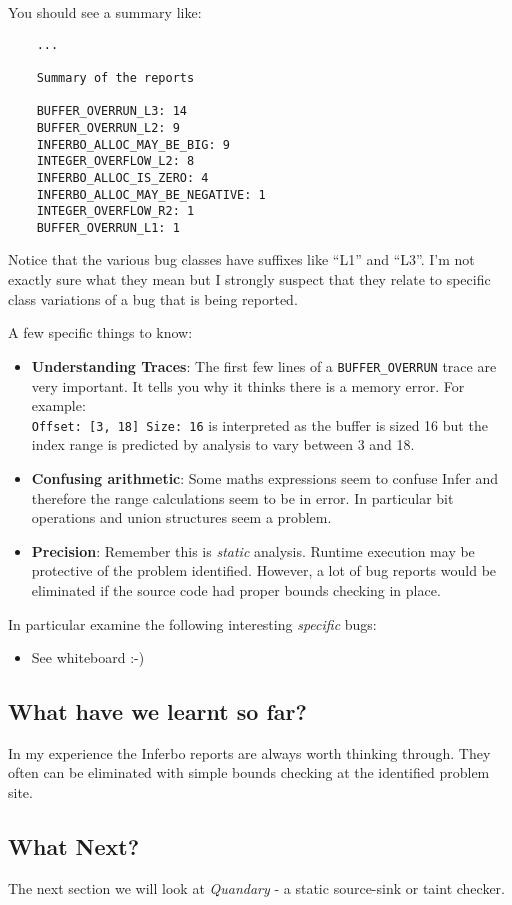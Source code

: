 You should see a summary like:
\begin{verbatim}
	...	
	
	Summary of the reports
	
	BUFFER_OVERRUN_L3: 14
	BUFFER_OVERRUN_L2: 9
	INFERBO_ALLOC_MAY_BE_BIG: 9
	INTEGER_OVERFLOW_L2: 8
	INFERBO_ALLOC_IS_ZERO: 4
	INFERBO_ALLOC_MAY_BE_NEGATIVE: 1
	INTEGER_OVERFLOW_R2: 1
	BUFFER_OVERRUN_L1: 1	
\end{verbatim}

Notice that the various bug classes have suffixes like ``L1'' and ``L3''. 
I'm not exactly sure what they mean but I strongly suspect that they relate 
to specific class variations of a bug that is being reported.

A few specific things to know:
\begin{itemize}
	\itemsep0em
	\item \textbf{Understanding Traces}: The first few lines of a \verb|BUFFER_OVERRUN| trace are very important. It tells you why it thinks there is a memory error. For example:\\
	\verb|Offset: [3, 18] Size: 16| is interpreted as the buffer is sized 16 but the index range is predicted by analysis to vary between 3 and 18. 
	\item \textbf{Confusing arithmetic}: Some maths expressions seem to confuse Infer and therefore
	the range calculations seem to be in error. In particular bit operations and union structures seem a problem.
	\item \textbf{Precision}: Remember this is \textit{static} analysis. Runtime execution may
	be protective of the problem identified. However, a lot of bug reports would be eliminated if
	the source code had proper bounds checking in place.
\end{itemize}

In particular examine the following interesting \textit{specific} bugs:
\begin{itemize}
	\item See whiteboard :-)
\end{itemize}

\subsection{What have we learnt so far?}

In my experience the Inferbo reports are always worth thinking through. 
They often can be eliminated with simple bounds checking at the identified problem site.

\subsection{What Next?}

The next section we will look at \textit{Quandary} - a static source-sink or taint checker.

